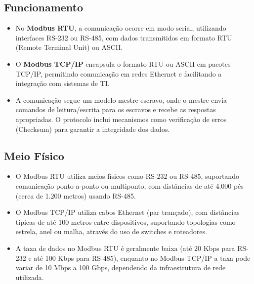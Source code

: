 \documentclass[a4paper,11pt]{article} %
\begin{document}
\subsection{Funcionamento}
\begin{itemize}
    \item No \textbf{Modbus RTU}, a comunicação ocorre em modo serial, utilizando interfaces RS-232 ou RS-485, com dados transmitidos em formato RTU (Remote Terminal Unit) ou ASCII.
    \item O \textbf{Modbus TCP/IP} encapsula o formato RTU ou ASCII em pacotes TCP/IP, permitindo comunicação em redes Ethernet e facilitando a integração com sistemas de TI.
    \item A comunicação segue um modelo mestre-escravo, onde o mestre envia comandos de leitura/escrita para os escravos e recebe as respostas apropriadas. O protocolo inclui mecanismos como verificação de erros (Checksum) para garantir a integridade dos dados.
\end{itemize}

\subsection{Meio Físico}
\begin{itemize}
    \item O Modbus RTU utiliza meios físicos como RS-232 ou RS-485, suportando comunicação ponto-a-ponto ou multiponto, com distâncias de até 4.000 pés (cerca de 1.200 metros) usando RS-485.
    \item O Modbus TCP/IP utiliza cabos Ethernet (par trançado), com distâncias típicas de até 100 metros entre dispositivos, suportando topologias como estrela, anel ou malha, através do uso de switches e roteadores.
    \item A taxa de dados no Modbus RTU é geralmente baixa (até 20 Kbps para RS-232 e até 100 Kbps para RS-485), enquanto no Modbus TCP/IP a taxa pode variar de 10 Mbps a 100 Gbps, dependendo da infraestrutura de rede utilizada.
\end{itemize}
\end{document}
